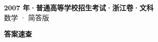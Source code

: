 \documentclass[zihao=-4, a4paper]{ctexart}
\begin{document}
\begin{center}
  {\Large\bfseries 2007 年·普通高等学校招生考试·浙江卷·文科}\\[4pt]
  {\large 数学 · 简答版}
\end{center}
\medskip
{}

\clearpage
{}
\begin{center}{\Large\bfseries 答案速查}\end{center}
\medskip

\end{document}
